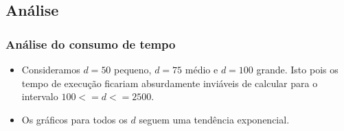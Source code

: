 \documentclass{beamer}
\begin{document}
\subsection{Análise}
\begin{frame}
  \frametitle{Análise do consumo de tempo}
  \begin{itemize}
    \item Consideramos $d = 50$ pequeno, $d = 75$ médio e $d = 100$ grande. Isto pois os tempo de execução ficariam absurdamente inviáveis de calcular para o intervalo $100 <= d <= 2500$.
    \item Os gráficos para todos os $d$ seguem uma tendência exponencial.
  \end{itemize}
\end{frame}
\end{document}
